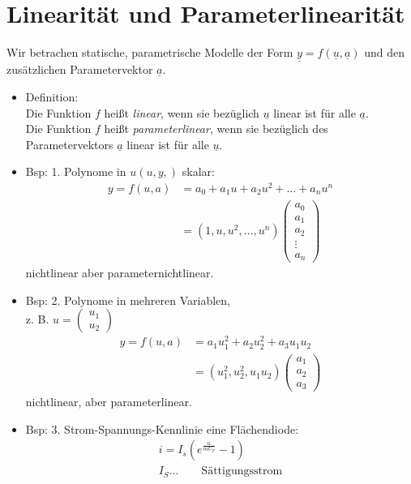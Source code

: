 \documentclass[ngerman]{tudscrreprt}
\begin{document}
	\section{Linearit\"at und Parameterlinearit\"at}
		Wir betrachen statische, parametrische Modelle der Form $\underline{y} = f(\underline{u}, \underline{a})$ und den zusätzlichen Parametervektor $ \underline{a}.$
	\begin{itemize}
	\item Definition:\\Die Funktion $f$ heißt \textit{linear}, wenn sie bezüglich $\underline{u}$ linear ist für alle $\underline{a}.$\\
	Die Funktion $f$ heißt \textit{parameterlinear}, wenn sie bezüglich des Parametervektors $\underline{a}$ linear ist für alle $\underline{u}.$ \\ 
	\item Bsp: 1. Polynome in $u (u, y, )$ skalar: \\ 
	\begin{align*}
	y = f(u,a) &= a_0 + a_1 u + a_2 u^2 + \dots + a_n u^n \\
	&= (1, u, u^2, \dots, u^n)\begin{pmatrix}
	a_0\\ a_1\\ a_2\\ \vdots\\ a_n
	\end{pmatrix}
	\end{align*}
	nichtlinear aber parameternichtlinear.
	\item Bsp: 2. Polynome in mehreren Variablen, \\ 
	z. B. $ u = \begin{pmatrix} u_1\\ u_2 \end{pmatrix}$
	\begin{align*}
	y = f(u,a) &= a_1 u_1^2 + a_2u_2^2 + a_3 u_1 u_2\\ 
	&= (u_1^2, u_2^2, u_1 u_2)\begin{pmatrix} a_1 \\ a_2\\ a_3 \end{pmatrix}
	\end{align*} 
	nichtlinear, aber parameterlinear.
	\item Bsp: 3. Strom-Spannungs-Kennlinie eine Flächendiode:
	\begin{align*}
	i = I_s (e^{\frac{u}{m U_T}} - 1)\\ 
	I_S \dots \qquad \text{Sättigungsstrom}\\ 

\end{align*}
\end{itemize}
\end{document}
